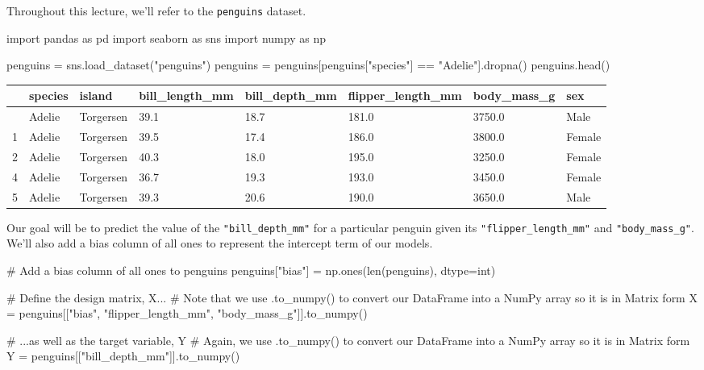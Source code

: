 \documentclass[
  letterpaper,
  DIV=11,
  numbers=noendperiod]{scrreprt}
\newenvironment{Shaded}{\begin{snugshade}}{\end{snugshade}}
\newcommand{\BuiltInTok}[1]{\textcolor[rgb]{0.00,0.23,0.31}{#1}}
\newcommand{\CommentTok}[1]{\textcolor[rgb]{0.37,0.37,0.37}{#1}}
\newcommand{\ImportTok}[1]{\textcolor[rgb]{0.00,0.46,0.62}{#1}}
\newcommand{\NormalTok}[1]{\textcolor[rgb]{0.00,0.23,0.31}{#1}}
\newcommand{\OperatorTok}[1]{\textcolor[rgb]{0.37,0.37,0.37}{#1}}
\newcommand{\StringTok}[1]{\textcolor[rgb]{0.13,0.47,0.30}{#1}}
\begin{document}
Throughout this lecture, we'll refer to the \texttt{penguins} dataset.

\begin{Shaded}
\begin{Highlighting}[]
\ImportTok{import}\NormalTok{ pandas }\ImportTok{as}\NormalTok{ pd}
\ImportTok{import}\NormalTok{ seaborn }\ImportTok{as}\NormalTok{ sns}
\ImportTok{import}\NormalTok{ numpy }\ImportTok{as}\NormalTok{ np}

\NormalTok{penguins }\OperatorTok{=}\NormalTok{ sns.load\_dataset(}\StringTok{"penguins"}\NormalTok{)}
\NormalTok{penguins }\OperatorTok{=}\NormalTok{ penguins[penguins[}\StringTok{"species"}\NormalTok{] }\OperatorTok{==} \StringTok{"Adelie"}\NormalTok{].dropna()}
\NormalTok{penguins.head()}
\end{Highlighting}
\end{Shaded}

\begin{longtable}[]{@{}llllllll@{}}
\toprule\noalign{}
& species & island & bill\_length\_mm & bill\_depth\_mm &
flipper\_length\_mm & body\_mass\_g & sex \\
\midrule\noalign{}
\endhead
\bottomrule\noalign{}
\endlastfoot
0 & Adelie & Torgersen & 39.1 & 18.7 & 181.0 & 3750.0 & Male \\
1 & Adelie & Torgersen & 39.5 & 17.4 & 186.0 & 3800.0 & Female \\
2 & Adelie & Torgersen & 40.3 & 18.0 & 195.0 & 3250.0 & Female \\
4 & Adelie & Torgersen & 36.7 & 19.3 & 193.0 & 3450.0 & Female \\
5 & Adelie & Torgersen & 39.3 & 20.6 & 190.0 & 3650.0 & Male \\
\end{longtable}

Our goal will be to predict the value of the \texttt{"bill\_depth\_mm"}
for a particular penguin given its \texttt{"flipper\_length\_mm"} and
\texttt{"body\_mass\_g"}. We'll also add a bias column of all ones to
represent the intercept term of our models.

\begin{Shaded}
\begin{Highlighting}[]
\CommentTok{\# Add a bias column of all ones to \textasciigrave{}penguins\textasciigrave{}}
\NormalTok{penguins[}\StringTok{"bias"}\NormalTok{] }\OperatorTok{=}\NormalTok{ np.ones(}\BuiltInTok{len}\NormalTok{(penguins), dtype}\OperatorTok{=}\BuiltInTok{int}\NormalTok{) }

\CommentTok{\# Define the design matrix, X...}
\CommentTok{\# Note that we use .to\_numpy() to convert our DataFrame into a NumPy array so it is in Matrix form}
\NormalTok{X }\OperatorTok{=}\NormalTok{ penguins[[}\StringTok{"bias"}\NormalTok{, }\StringTok{"flipper\_length\_mm"}\NormalTok{, }\StringTok{"body\_mass\_g"}\NormalTok{]].to\_numpy()}

\CommentTok{\# ...as well as the target variable, Y}
\CommentTok{\# Again, we use .to\_numpy() to convert our DataFrame into a NumPy array so it is in Matrix form}
\NormalTok{Y }\OperatorTok{=}\NormalTok{ penguins[[}\StringTok{"bill\_depth\_mm"}\NormalTok{]].to\_numpy()}
\end{Highlighting}
\end{Shaded}
\end{document}
